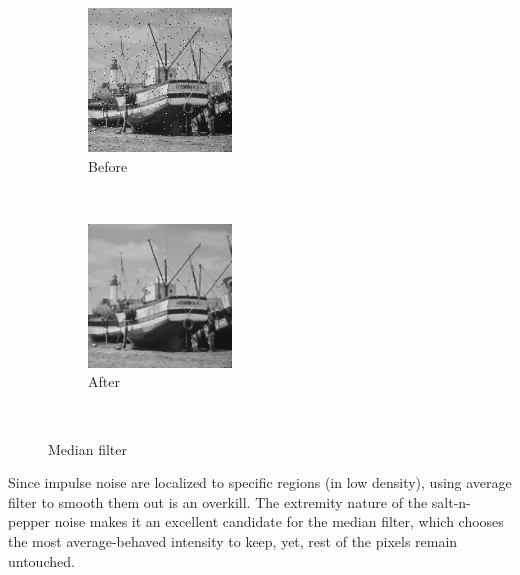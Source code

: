\documentclass[12pt]{article}
\begin{document}
\begin{figure}[ht!]
    \centering
    \begin{subfigure}[t]{0.3\textwidth}
        \centering
        \includegraphics[height=1.5in]{images/S1}
        \caption{Before}
    \end{subfigure}%
    ~ 
    \begin{subfigure}[t]{0.3\textwidth}
        \centering
        \includegraphics[height=1.5in]{images/Rs}
        \caption{After}
    \end{subfigure}%
    ~
    \caption{Median filter}
\end{figure}

Since impulse noise are localized to specific regions (in low density), using average filter to smooth them out is an overkill.
The extremity nature of the salt-n-pepper noise makes it an excellent candidate for the median filter, which chooses the most average-behaved intensity to keep, yet, rest of the pixels remain untouched.
\end{document}
